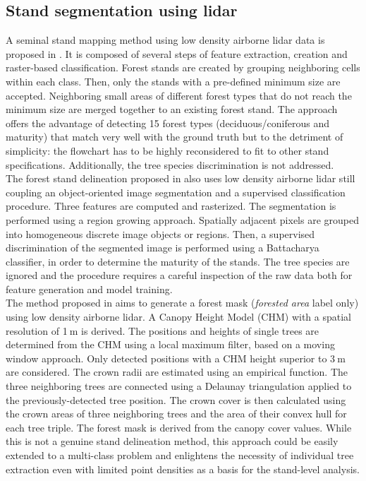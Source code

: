 \subsection{Stand segmentation using lidar}
A seminal stand mapping method using low density airborne lidar data is proposed in \citep{koch2009airborne}. It is composed of several steps of feature extraction, creation and raster-based classification. Forest stands are created by grouping neighboring cells within each class. Then, only the stands with a pre-defined minimum size are accepted. Neighboring small areas of different forest types that do not reach the minimum size are merged together to an existing forest stand. The approach offers the advantage of detecting 15 forest types (deciduous/coniferous and maturity) that match very well with the ground truth but to the detriment of simplicity: the flowchart has to be highly reconsidered to fit to other stand specifications. Additionally, the tree species discrimination is not addressed.\\

The forest stand delineation proposed in \citep{sullivan2009object} also uses low density airborne lidar still coupling an object-oriented image segmentation and a supervised classification procedure. Three features are computed and rasterized. The segmentation is performed using a region growing approach. Spatially adjacent pixels are grouped into homogeneous discrete image objects or regions. Then, a supervised discrimination of the segmented image is performed using a Battacharya classifier, in order to determine the maturity of the stands. The tree species are ignored and the procedure requires a careful inspection of the raw data both for feature generation and model training. \\

The method proposed in \citep{eysn2012forest} aims to generate a forest mask (\textit{forested area} label only) using low density airborne lidar. A Canopy Height Model (CHM) with a spatial resolution of 1$\:$m is derived. The positions and heights of single trees are determined from the CHM using a local maximum filter, based on a moving window approach. Only detected positions with a CHM height superior to 3$\:$m are considered. The crown radii are estimated using an empirical function. The three neighboring trees are connected using a Delaunay triangulation applied to the previously-detected tree position. The crown cover is then calculated using the crown areas of three neighboring trees and the area of their convex hull for each tree triple. The forest mask is derived from the canopy cover values. While this is not a genuine stand delineation method, this approach could be easily extended to a multi-class problem and enlightens the necessity of individual tree extraction even with limited point densities as a basis for the stand-level analysis.\\

